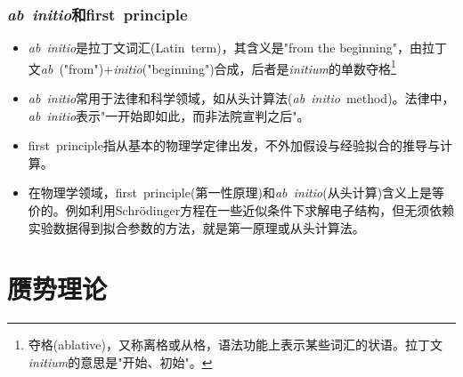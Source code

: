 \documentclass[cjk,slidestop,compress,mathserif,blue]{beamer}
\begin{document}
\frame
{
	\frametitle{\textit{ab~initio}和\textrm{first~principle}}
	\begin{itemize}
		\item \textit{ab~initio}是拉丁文词汇(\textrm{Latin~term})，其含义是\textrm{"from the beginning"}，由拉丁文\textit{ab}~\textrm{("from")}+\textit{initio}\textrm{("beginning")}合成，后者是\textit{initium}的单数夺格\footnote{夺格\textrm{(ablative)}，又称离格或从格，语法功能上表示某些词汇的状语。拉丁文\textit{initium}的意思是"开始、初始"。}
		\item \textit{ab~initio}常用于法律和科学领域，如从头计算法(\textit{ab~initio}~\textrm{method})。法律中，\textit{ab~initio}表示"一开始即如此，而非法院宣判之后"。
		\item \textrm{first~principle}指从基本的物理学定律出发，不外加假设与经验拟合的推导与计算。
		\item 在物理学领域，\textrm{first~principle}(第一性原理)和\textit{ab~initio}(从头计算)含义上是等价的。例如利用\textrm{Schr\"odinger}方程在一些近似条件下求解电子结构，但无须依赖实验数据得到拟合参数的方法，就是第一原理或从头计算法。
	\end{itemize}
}

\section{赝势理论}       %
\end{document}
